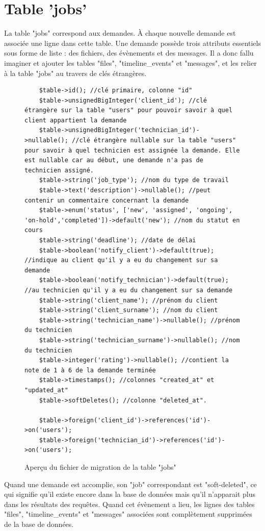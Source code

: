 \documentclass[
    iai, %
    eai, %
]{heig-tb}
\begin{document}
\newpage
\section{Table 'jobs'}
La table "jobs" correspond aux demandes. À chaque nouvelle demande est associée une ligne dans cette table. Une demande possède trois attributs essentiels sous forme de liste : des fichiers, des évènements et des messages. Il a donc fallu imaginer et ajouter les tables "files", "timeline\_events" et "messages", et les relier à la table "jobs" au travers de clés étrangères.

\begin{figure}[h]
  \begin{verbatim}
    $table->id(); //clé primaire, colonne "id"
    $table->unsignedBigInteger('client_id'); //clé étrangère sur la table "users" pour pouvoir savoir à quel client appartient la demande
    $table->unsignedBigInteger('technician_id')->nullable(); //clé étrangère nullable sur la table "users" pour savoir à quel technicien est assignée la demande. Elle est nullable car au début, une demande n'a pas de technicien assigné.
    $table->string('job_type'); //nom du type de travail
    $table->text('description')->nullable(); //peut contenir un commentaire concernant la demande
    $table->enum('status', ['new', 'assigned', 'ongoing', 'on-hold','completed'])->default('new'); //nom du statut en cours
    $table->string('deadline'); //date de délai
    $table->boolean('notify_client')->default(true); //indique au client qu'il y a eu du changement sur sa demande
    $table->boolean('notify_technician')->default(true); //au technicien qu'il y a eu du changement sur sa demande
    $table->string('client_name'); //prénom du client
    $table->string('client_surname'); //nom du client
    $table->string('technician_name')->nullable(); //prénom du technicien
    $table->string('technician_surname')->nullable(); //nom du technicien
    $table->integer('rating')->nullable(); //contient la note de 1 à 6 de la demande terminée
    $table->timestamps(); //colonnes "created_at" et "updated_at"
    $table->softDeletes(); //colonne "deleted_at".

    $table->foreign('client_id')->references('id')->on('users');
    $table->foreign('technician_id')->references('id')->on('users');
  \end{verbatim}
  \caption{Aperçu du fichier de migration de la table "jobs"}
\end{figure}

Quand une demande est accomplie, son "job" correspondant est "soft-deleted", ce qui signifie qu'il existe encore dans la base de données mais qu'il n'apparait plus dans les résultats des requêtes.
Quand cet évènement a lieu, les lignes des tables "files", "timeline\_events" et "messages" associées sont complètement supprimées de la base de données.
\end{document}
